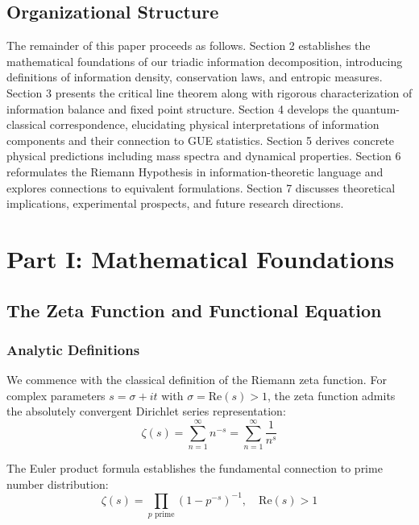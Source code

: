 \documentclass[12pt]{article}
\theoremstyle{plain}
\theoremstyle{definition}
\begin{document}
\subsection{Organizational Structure}

The remainder of this paper proceeds as follows. Section 2 establishes the mathematical foundations of our triadic information decomposition, introducing definitions of information density, conservation laws, and entropic measures. Section 3 presents the critical line theorem along with rigorous characterization of information balance and fixed point structure. Section 4 develops the quantum-classical correspondence, elucidating physical interpretations of information components and their connection to GUE statistics. Section 5 derives concrete physical predictions including mass spectra and dynamical properties. Section 6 reformulates the Riemann Hypothesis in information-theoretic language and explores connections to equivalent formulations. Section 7 discusses theoretical implications, experimental prospects, and future research directions.

\section{Part I: Mathematical Foundations}

\subsection{The Zeta Function and Functional Equation}

\subsubsection{Analytic Definitions}

We commence with the classical definition of the Riemann zeta function. For complex parameters $s = \sigma + it$ with $\sigma = \text{Re}(s) > 1$, the zeta function admits the absolutely convergent Dirichlet series representation:
\begin{equation}
\zeta(s) = \sum_{n=1}^{\infty} n^{-s} = \sum_{n=1}^{\infty} \frac{1}{n^s}
\end{equation}

The Euler product formula establishes the fundamental connection to prime number distribution:
\begin{equation}
\zeta(s) = \prod_{p \text{ prime}} \left(1 - p^{-s}\right)^{-1}, \quad \text{Re}(s) > 1
\end{equation}
\end{document}
